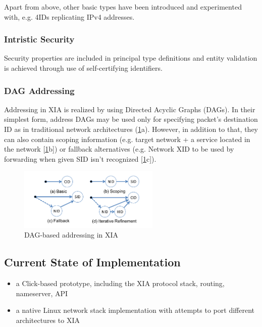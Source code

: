                 Apart from above, other basic types have been introduced and experimented with, e.g. 4IDs replicating IPv4 addresses.

            \subsubsection{Intristic Security}

                Security properties are included in principal type definitions and entity validation is achieved through use of self-certifying identifiers.

            \subsubsection{DAG Addressing}

                Addressing in XIA is realized by using Directed Acyclic Graphs (DAGs). In their simplest form, address DAGs may be used only for specifying packet's destination ID as in traditional network architectures (\ref{fig:xia_dag}a). However, in addition to that, they can also contain scoping information (e.g. target network + a service located in the network [\ref{fig:xia_dag}b]) or fallback alternatives (e.g. Network XID to be used by forwarding when given SID isn't recognized [\ref{fig:xia_dag}c]).

                \begin{figure}[H]
                    \begin{center}
                        \includegraphics[width=0.6\textwidth]{fig/archs_xia-dag.png}
                        \caption{DAG-based addressing in XIA}
                        \label{fig:xia_dag}
                    \end{center}
                \end{figure}

        \subsection{Current State of Implementation}

            \begin{itemize}
                \item a Click-based prototype, including the XIA protocol stack, routing, nameserver, API
                \item a native Linux network stack implementation with attempts to port different architectures to XIA
            \end{itemize}


